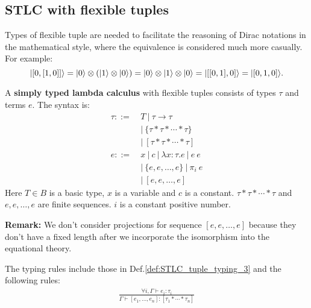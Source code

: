 

\subsection{STLC with flexible tuples}

Types of flexible tuple are needed to facilitate the reasoning of Dirac notations in the mathematical style, where the equivalence is considered much more casually. For example:
$$
|[0,[1,0]]\rangle = |0\rangle \otimes (|1\rangle \otimes |0\rangle) = |0\rangle \otimes |1\rangle \otimes |0\rangle = |[[0, 1], 0]\rangle = |[0, 1, 0]\rangle.
$$

\begin{definition}
  A \textbf{simply typed lambda calculus} with flexible tuples consists of types $\tau$ and terms $e$. The syntax is:
  \begin{align*}
      \tau ::=&\ T\ |\ \tau \to \tau\\
        &\ |\ \{ \tau * \tau * \cdots * \tau \} \\
        &\ |\ [ \tau * \tau * \cdots * \tau ] \\
      e ::=&\ x\ |\ c\ |\ \lambda x : \tau. e\ |\ e\ e\\
        &\ |\ \{ e, e, \dots, e \}\ |\ \pi_i\ e \\
        &\ |\ [ e, e, \dots, e ]
  \end{align*}
  Here $T \in B$ is a basic type, $x$ is a variable and $c$ is a constant.
  $\tau * \tau * \cdots * \tau$ and $e, e, \dots, e$ are finite sequences. $i$ is a constant positive number.
\end{definition}

\textbf{Remark: }We don't consider projections for sequence $[ e, e, \dots, e ]$ because they don't have a fixed length after we incorporate the isomorphism into the equational theory.



\begin{definition}
  \label{def:STLC_flexible_tuple_typing_3}
  The typing rules include those in Def.\ref{def:STLC_tuple_typing_3} and the following rules:
  \begin{gather*}
      \frac{\forall i, \Gamma \vdash e_i : \tau_i}{\Gamma \vdash [e_1, \dots, e_n ] : [ \tau_1 * \cdots * \tau_n ]}
  \end{gather*}
\end{definition}

